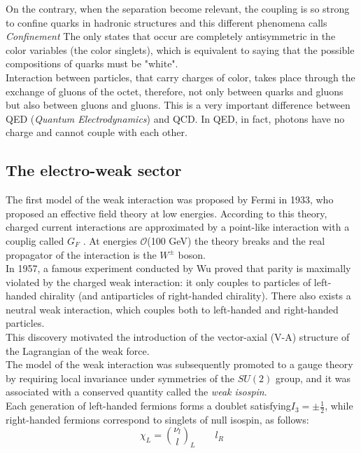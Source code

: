 On the contrary, when the separation become relevant, the coupling is so strong to confine quarks in hadronic  structures and this different phenomena calls \textit{Confinement}
The only states that occur are completely antisymmetric in the color variables (the color singlets), which is equivalent to saying that the possible compositions of quarks must be "white".\\
Interaction between particles, that carry charges of color, takes place through the exchange of gluons of the octet, therefore, not only between quarks and gluons but also between gluons and gluons. This is a very important difference between QED (\textit{Quantum Electrodynamics}) and QCD. In QED, in fact, photons have no charge and cannot couple with each other.

\subsection{The electro-weak sector}
\label{sec:ew}
The first model of the weak interaction was proposed by Fermi in 1933, who proposed an effective field theory at low energies. According to this theory, 
charged current interactions are approximated by a point-like interaction with a couplig called $G_F$ \cite{fermi,wilson}.
At energies $\mathcal{O}$(100 GeV) the theory breaks and the real propagator of the interaction is the $W^\pm$ boson.\\
In 1957, a famous experiment conducted by Wu \cite{wu} proved that parity is maximally violated by the charged
weak interaction: it only couples to particles of left-handed chirality (and antiparticles of right-handed chirality). There also exists a neutral weak interaction, which couples both
to left-handed and right-handed particles. \\
This discovery motivated the introduction of the vector-axial (V-A) structure of the Lagrangian of the weak force. \\
The model of the weak interaction was subsequently promoted to a gauge theory by requiring local invariance under symmetries of the $SU(2)$ group, and it was associated
with a conserved quantity called the \textit{weak isospin}.
\vspace{\baselineskip}
\\Each generation of left-handed fermions forms a doublet satisfying$I_{3}= \pm\frac{1}{2}$, while right-handed fermions correspond to singlets of null isospin, as follows:
\begin{equation} 
\chi_{L}=\binom{\nu_l}{l}_L  \qquad l_R
\end{equation}
